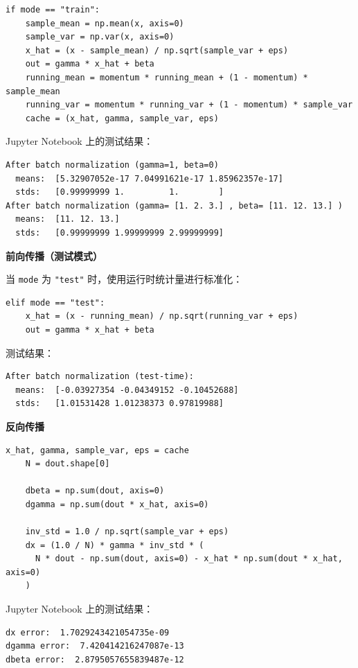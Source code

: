 \begin{lstlisting}[style=cleanpython]
if mode == "train":
    sample_mean = np.mean(x, axis=0)
    sample_var = np.var(x, axis=0)
    x_hat = (x - sample_mean) / np.sqrt(sample_var + eps)
    out = gamma * x_hat + beta
    running_mean = momentum * running_mean + (1 - momentum) * sample_mean
    running_var = momentum * running_var + (1 - momentum) * sample_var
    cache = (x_hat, gamma, sample_var, eps)
\end{lstlisting}

Jupyter Notebook 上的测试结果：

\begin{lstlisting}[style=cleanpython]
After batch normalization (gamma=1, beta=0)
  means:  [5.32907052e-17 7.04991621e-17 1.85962357e-17]
  stds:   [0.99999999 1.         1.        ]
After batch normalization (gamma= [1. 2. 3.] , beta= [11. 12. 13.] )
  means:  [11. 12. 13.]
  stds:   [0.99999999 1.99999999 2.99999999]
\end{lstlisting}

\textbf{前向传播（测试模式）}

当 \texttt{mode} 为 \texttt{"test"} 时，使用运行时统计量进行标准化：

\begin{lstlisting}[style=cleanpython]
elif mode == "test":
    x_hat = (x - running_mean) / np.sqrt(running_var + eps)
    out = gamma * x_hat + beta
\end{lstlisting}

测试结果：
\begin{lstlisting}[style=cleanpython]
After batch normalization (test-time):
  means:  [-0.03927354 -0.04349152 -0.10452688]
  stds:   [1.01531428 1.01238373 0.97819988]
\end{lstlisting}


\textbf{反向传播}

\begin{lstlisting}[style=cleanpython]
    x_hat, gamma, sample_var, eps = cache
    N = dout.shape[0]

    dbeta = np.sum(dout, axis=0)
    dgamma = np.sum(dout * x_hat, axis=0)

    inv_std = 1.0 / np.sqrt(sample_var + eps)
    dx = (1.0 / N) * gamma * inv_std * (
      N * dout - np.sum(dout, axis=0) - x_hat * np.sum(dout * x_hat, axis=0)
    )
\end{lstlisting}

Jupyter Notebook 上的测试结果：

\begin{lstlisting}[style=cleanpython]
dx error:  1.7029243421054735e-09
dgamma error:  7.420414216247087e-13
dbeta error:  2.8795057655839487e-12
\end{lstlisting}

